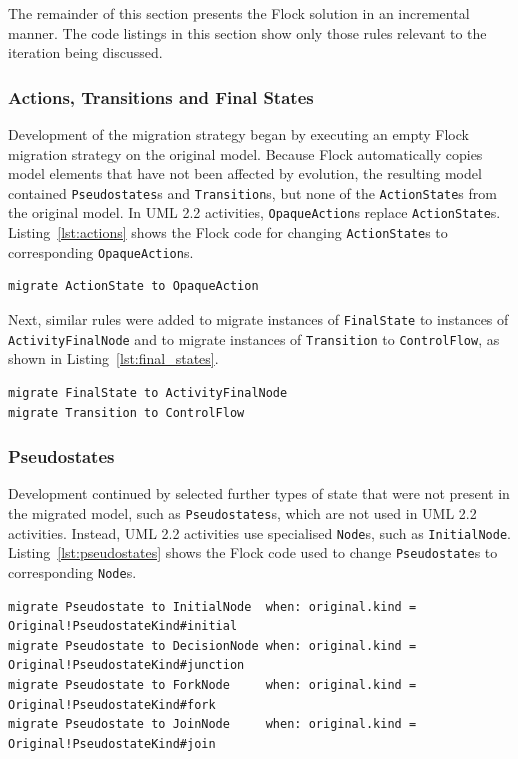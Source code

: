 The remainder of this section presents the Flock solution in an incremental manner. The code listings in this section show only those rules relevant to the iteration being discussed.

\subsubsection{Actions, Transitions and Final States}
Development of the migration strategy began by executing an empty Flock migration strategy on the original model. Because Flock automatically copies model elements that have not been affected by evolution, the resulting model contained \texttt{Pseudostates}s and \texttt{Transition}s, but none of the \texttt{ActionState}s from the original model. In UML 2.2 activities, \texttt{OpaqueAction}s replace \texttt{ActionState}s. Listing~\ref{lst:actions} shows the Flock code for changing \texttt{ActionState}s to corresponding \texttt{OpaqueAction}s.

\begin{lstlisting}[caption=Migrating Actions, label=lst:actions, language=Flock]
migrate ActionState to OpaqueAction
\end{lstlisting}

Next, similar rules were added to migrate instances of \texttt{FinalState} to instances of \texttt{ActivityFinalNode} and to migrate instances of \texttt{Transition} to \texttt{ControlFlow}, as shown in Listing~\ref{lst:final_states}.

\begin{lstlisting}[caption=Migrating FinalStates and Transitions, label=lst:final_states, language=Flock]
migrate FinalState to ActivityFinalNode
migrate Transition to ControlFlow
\end{lstlisting}

\subsubsection{Pseudostates}
Development continued by selected further types of state that were not present in the migrated model, such as \texttt{Pseudostates}s, which are not used in UML 2.2 activities. Instead, UML 2.2 activities use specialised \texttt{Node}s, such as \texttt{InitialNode}. Listing~\ref{lst:pseudostates} shows the Flock code used to change \texttt{Pseudostate}s to corresponding \texttt{Node}s.

\begin{lstlisting}[caption=Migrating Pseudostates, label=lst:pseudostates, language=Flock]
migrate Pseudostate to InitialNode  when: original.kind = Original!PseudostateKind#initial
migrate Pseudostate to DecisionNode when: original.kind = Original!PseudostateKind#junction
migrate Pseudostate to ForkNode     when: original.kind = Original!PseudostateKind#fork
migrate Pseudostate to JoinNode     when: original.kind = Original!PseudostateKind#join
\end{lstlisting}

